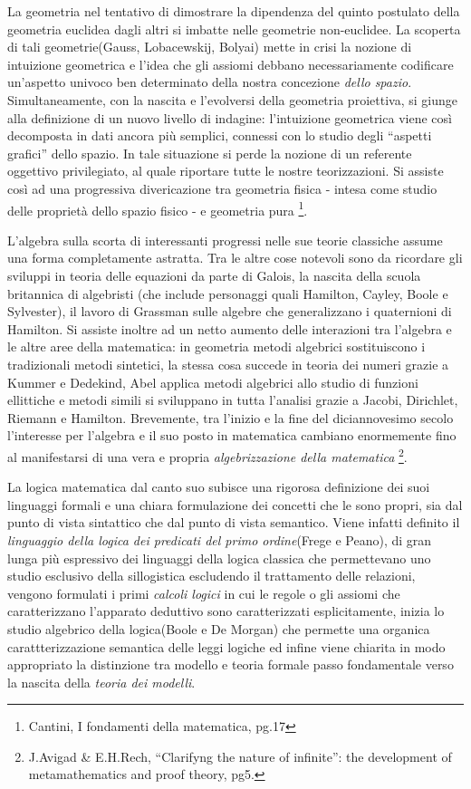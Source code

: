 La geometria nel tentativo di dimostrare la dipendenza del quinto
postulato della geometria euclidea dagli altri si imbatte nelle geometrie
non-euclidee. La scoperta di tali geometrie(Gauss, Lobacewskij, Bolyai)
mette in crisi la nozione di intuizione geometrica e l'idea che gli
assiomi debbano necessariamente codificare un'aspetto univoco ben
determinato della nostra concezione \emph{dello spazio}. Simultaneamente,
con la nascita e l'evolversi della geometria proiettiva, si giunge
alla definizione di un nuovo livello di indagine: l'intuizione geometrica
viene così decomposta in dati ancora più semplici, connessi con lo
studio degli {}``aspetti grafici'' dello spazio. In tale situazione
si perde la nozione di un referente oggettivo privilegiato, al quale
riportare tutte le nostre teorizzazioni. Si assiste così ad una progressiva
divericazione tra geometria fisica - intesa come studio delle proprietà
dello spazio fisico - e geometria pura%
\footnote{Cantini, I fondamenti della matematica, pg.17%
}.

L'algebra sulla scorta di interessanti progressi nelle sue teorie
classiche assume una forma completamente astratta. Tra le altre cose
notevoli sono da ricordare gli sviluppi in teoria delle equazioni
da parte di Galois, la nascita della scuola britannica di algebristi
(che include personaggi quali Hamilton, Cayley, Boole e Sylvester),
il lavoro di Grassman sulle algebre che generalizzano i quaternioni
di Hamilton. Si assiste inoltre ad un netto aumento delle interazioni
tra l'algebra e le altre aree della matematica: in geometria metodi
algebrici sostituiscono i tradizionali metodi sintetici, la stessa
cosa succede in teoria dei numeri grazie a Kummer e Dedekind, Abel
applica metodi algebrici allo studio di funzioni ellittiche e metodi
simili si sviluppano in tutta l'analisi grazie a Jacobi, Dirichlet,
Riemann e Hamilton. Brevemente, tra l'inizio e la fine del diciannovesimo
secolo l'interesse per l'algebra e il suo posto in matematica cambiano
enormemente fino al manifestarsi di una vera e propria \emph{algebrizzazione
della matematica}%
\footnote{J.Avigad \& E.H.Rech, {}``Clarifyng the nature of infinite'': the
development of metamathematics and proof theory, pg5.%
}.

La logica matematica dal canto suo subisce una rigorosa definizione
dei suoi linguaggi formali e una chiara formulazione dei concetti
che le sono propri, sia dal punto di vista sintattico che dal punto
di vista semantico. Viene infatti definito il \emph{linguaggio della
logica dei predicati del primo ordine}(Frege e Peano), di gran lunga
più espressivo dei linguaggi della logica classica che permettevano
uno studio esclusivo della sillogistica escludendo il trattamento
delle relazioni, vengono formulati i primi \emph{calcoli logici} in
cui le regole o gli assiomi che caratterizzano l'apparato deduttivo
sono caratterizzati esplicitamente, inizia lo studio algebrico della
logica(Boole e De Morgan) che permette una organica carattterizzazione
semantica delle leggi logiche ed infine viene chiarita in modo appropriato
la distinzione tra modello e teoria formale passo fondamentale verso
la nascita della \emph{teoria dei modelli}.


